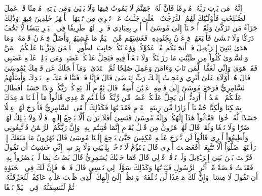إِنَّهُۥ مَن يَأۡتِ رَبَّهُۥ مُجۡرِمٗا فَإِنَّ لَهُۥ جَهَنَّمَ لَا يَمُوتُ فِيهَا وَلَا يَحۡيَىٰ
وَمَن يَأۡتِهِۦ مُؤۡمِنٗا قَدۡ عَمِلَ ٱلصَّـٰلِحَٰتِ فَأُوْلَـٰٓئِكَ لَهُمُ ٱلدَّرَجَٰتُ ٱلۡعُلَىٰ
جَنَّـٰتُ عَدۡنٖ تَجۡرِي مِن تَحۡتِهَا ٱلۡأَنۡهَٰرُ خَٰلِدِينَ فِيهَاۚ وَذَٰلِكَ جَزَآءُ مَن تَزَكَّىٰ
وَلَقَدۡ أَوۡحَيۡنَآ إِلَىٰ مُوسَىٰٓ أَنۡ أَسۡرِ بِعِبَادِي فَٱضۡرِبۡ لَهُمۡ طَرِيقٗا فِي ٱلۡبَحۡرِ يَبَسٗا لَّا تَخَٰفُ دَرَكٗا وَلَا تَخۡشَىٰ
فَأَتۡبَعَهُمۡ فِرۡعَوۡنُ بِجُنُودِهِۦ فَغَشِيَهُم مِّنَ ٱلۡيَمِّ مَا غَشِيَهُمۡ
وَأَضَلَّ فِرۡعَوۡنُ قَوۡمَهُۥ وَمَا هَدَىٰ
يَٰبَنِيٓ إِسۡرَـٰٓءِيلَ قَدۡ أَنجَيۡنَٰكُم مِّنۡ عَدُوِّكُمۡ وَوَٰعَدۡنَٰكُمۡ جَانِبَ ٱلطُّورِ ٱلۡأَيۡمَنَ وَنَزَّلۡنَا عَلَيۡكُمُ ٱلۡمَنَّ وَٱلسَّلۡوَىٰ
كُلُواْ مِن طَيِّبَٰتِ مَا رَزَقۡنَٰكُمۡ وَلَا تَطۡغَوۡاْ فِيهِ فَيَحِلَّ عَلَيۡكُمۡ غَضَبِيۖ وَمَن يَحۡلِلۡ عَلَيۡهِ غَضَبِي فَقَدۡ هَوَىٰ
وَإِنِّي لَغَفَّارٞ لِّمَن تَابَ وَءَامَنَ وَعَمِلَ صَٰلِحٗا ثُمَّ ٱهۡتَدَىٰ
۞وَمَآ أَعۡجَلَكَ عَن قَوۡمِكَ يَٰمُوسَىٰ
قَالَ هُمۡ أُوْلَآءِ عَلَىٰٓ أَثَرِي وَعَجِلۡتُ إِلَيۡكَ رَبِّ لِتَرۡضَىٰ
قَالَ فَإِنَّا قَدۡ فَتَنَّا قَوۡمَكَ مِنۢ بَعۡدِكَ وَأَضَلَّهُمُ ٱلسَّامِرِيُّ
فَرَجَعَ مُوسَىٰٓ إِلَىٰ قَوۡمِهِۦ غَضۡبَٰنَ أَسِفٗاۚ قَالَ يَٰقَوۡمِ أَلَمۡ يَعِدۡكُمۡ رَبُّكُمۡ وَعۡدًا حَسَنًاۚ أَفَطَالَ عَلَيۡكُمُ ٱلۡعَهۡدُ أَمۡ أَرَدتُّمۡ أَن يَحِلَّ عَلَيۡكُمۡ غَضَبٞ مِّن رَّبِّكُمۡ فَأَخۡلَفۡتُم مَّوۡعِدِي
قَالُواْ مَآ أَخۡلَفۡنَا مَوۡعِدَكَ بِمَلۡكِنَا وَلَٰكِنَّا حُمِّلۡنَآ أَوۡزَارٗا مِّن زِينَةِ ٱلۡقَوۡمِ فَقَذَفۡنَٰهَا فَكَذَٰلِكَ أَلۡقَى ٱلسَّامِرِيُّ
فَأَخۡرَجَ لَهُمۡ عِجۡلٗا جَسَدٗا لَّهُۥ خُوَارٞ فَقَالُواْ هَٰذَآ إِلَٰهُكُمۡ وَإِلَٰهُ مُوسَىٰ فَنَسِيَ
أَفَلَا يَرَوۡنَ أَلَّا يَرۡجِعُ إِلَيۡهِمۡ قَوۡلٗا وَلَا يَمۡلِكُ لَهُمۡ ضَرّٗا وَلَا نَفۡعٗا
وَلَقَدۡ قَالَ لَهُمۡ هَٰرُونُ مِن قَبۡلُ يَٰقَوۡمِ إِنَّمَا فُتِنتُم بِهِۦۖ وَإِنَّ رَبَّكُمُ ٱلرَّحۡمَٰنُ فَٱتَّبِعُونِي وَأَطِيعُوٓاْ أَمۡرِي
قَالُواْ لَن نَّبۡرَحَ عَلَيۡهِ عَٰكِفِينَ حَتَّىٰ يَرۡجِعَ إِلَيۡنَا مُوسَىٰ
قَالَ يَٰهَٰرُونُ مَا مَنَعَكَ إِذۡ رَأَيۡتَهُمۡ ضَلُّوٓاْ
أَلَّا تَتَّبِعَنِۖ أَفَعَصَيۡتَ أَمۡرِي
قَالَ يَبۡنَؤُمَّ لَا تَأۡخُذۡ بِلِحۡيَتِي وَلَا بِرَأۡسِيٓۖ إِنِّي خَشِيتُ أَن تَقُولَ فَرَّقۡتَ بَيۡنَ بَنِيٓ إِسۡرَـٰٓءِيلَ وَلَمۡ تَرۡقُبۡ قَوۡلِي
قَالَ فَمَا خَطۡبُكَ يَٰسَٰمِرِيُّ
قَالَ بَصُرۡتُ بِمَا لَمۡ يَبۡصُرُواْ بِهِۦ فَقَبَضۡتُ قَبۡضَةٗ مِّنۡ أَثَرِ ٱلرَّسُولِ فَنَبَذۡتُهَا وَكَذَٰلِكَ سَوَّلَتۡ لِي نَفۡسِي
قَالَ فَٱذۡهَبۡ فَإِنَّ لَكَ فِي ٱلۡحَيَوٰةِ أَن تَقُولَ لَا مِسَاسَۖ وَإِنَّ لَكَ مَوۡعِدٗا لَّن تُخۡلَفَهُۥۖ وَٱنظُرۡ إِلَىٰٓ إِلَٰهِكَ ٱلَّذِي ظَلۡتَ عَلَيۡهِ عَاكِفٗاۖ لَّنُحَرِّقَنَّهُۥ ثُمَّ لَنَنسِفَنَّهُۥ فِي ٱلۡيَمِّ نَسۡفًا
